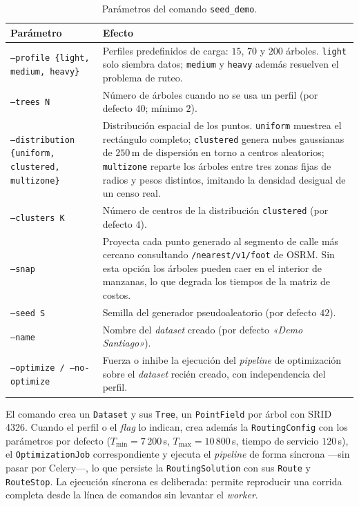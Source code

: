 \begin{table}[H]
  \centering
  \caption{Parámetros del comando \texttt{seed\_demo}.}
  \label{tab:anexo_seed_demo}
  \small
  \begin{tabularx}{\textwidth}{@{}p{5.5cm} X@{}}
    \toprule
    Parámetro &
      Efecto \\
    \midrule
    \texttt{--profile \{light, medium, heavy\}} &
      Perfiles predefinidos de carga: $15$, $70$ y $200$ árboles. \texttt{light} solo siembra
      datos; \texttt{medium} y \texttt{heavy} además resuelven el problema de ruteo. \\
    \texttt{--trees N} &
      Número de árboles cuando no se usa un perfil (por defecto $40$; mínimo $2$). \\
    \texttt{--distribution \{uniform, clustered, multizone\}} &
      Distribución espacial de los puntos. \texttt{uniform} muestrea el rectángulo completo;
      \texttt{clustered} genera nubes gaussianas de $250$\,m de dispersión en torno a centros
      aleatorios; \texttt{multizone} reparte los árboles entre tres zonas fijas de radios y
      pesos distintos, imitando la densidad desigual de un censo real. \\
    \texttt{--clusters K} &
      Número de centros de la distribución \texttt{clustered} (por defecto $4$). \\
    \texttt{--snap} &
      Proyecta cada punto generado al segmento de calle más cercano consultando
      \texttt{/nearest/v1/foot} de OSRM. Sin esta opción los árboles pueden caer en el interior
      de manzanas, lo que degrada los tiempos de la matriz de costos. \\
    \texttt{--seed S} &
      Semilla del generador pseudoaleatorio (por defecto $42$). \\
    \texttt{--name} &
      Nombre del \textit{dataset} creado (por defecto \textit{«Demo Santiago»}). \\
    \texttt{--optimize / --no-optimize} &
      Fuerza o inhibe la ejecución del \textit{pipeline} de optimización sobre el
      \textit{dataset} recién creado, con independencia del perfil. \\
    \bottomrule
  \end{tabularx}
\end{table}

El comando crea un \texttt{Dataset} y sus \texttt{Tree}, un \texttt{PointField} por
árbol con SRID 4326. Cuando el perfil o el \textit{flag} lo indican, crea además la
\texttt{RoutingConfig} con los parámetros por defecto ($T_{\min} = 7\,200$\,s,
$T_{\max} = 10\,800$\,s, tiempo de servicio $120$\,s), el \texttt{OptimizationJob}
correspondiente y ejecuta el \textit{pipeline} de forma síncrona ---sin pasar por
Celery---, lo que persiste la \texttt{RoutingSolution} con sus \texttt{Route} y
\texttt{RouteStop}. La ejecución síncrona es deliberada: permite reproducir una
corrida completa desde la línea de comandos sin levantar el \textit{worker}.

